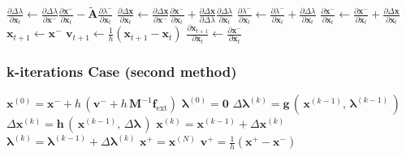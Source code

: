 \documentclass{article}
\newcommand{\pdc}[2]{\frac{\partial #1}{\partial #2}}
\newcommand{\graycomment}[1]{\Comment{\textcolor{gray}{#1}}}
\begin{document}
\begin{algorithm}[H]
\begin{algorithmic}[1]
    \State $\pdc{\Delta \lambda}{\mathbf{x}_t} \gets \pdc{\Delta \lambda}{\mathbf{x}^-}\pdc{\mathbf{x}^-}{\mathbf{x}_t} - \tilde{\mathbf{A}}\pdc{\lambda^-}{\mathbf{x}_t}$
    \graycomment{Eq.~\ref{eq:diffXPBD:explicit:four_needed_derivatives}}
    \State $\pdc{\Delta \mathbf{x}}{\mathbf{x}_t} \gets \pdc{\Delta \mathbf{x}}{\mathbf{x}^-}\pdc{\mathbf{x}^-}{\mathbf{x}_t} + \pdc{\Delta \mathbf{x}}{\Delta \lambda}\pdc{\Delta \lambda}{\mathbf{x}_t}$
    \graycomment{Eq.~\ref{eq:diffXPBD:explicit:four_needed_derivatives}}
    \State $\pdc{\lambda^-}{\mathbf{x}_t}  \gets \pdc{\lambda^-}{\mathbf{x}_t} + \pdc{\Delta \lambda}{\mathbf{x}_t}$
    \graycomment{Eq.~\ref{eq:diffXPBD:explicit:four_needed_derivatives}}
    \State $\pdc{\mathbf{x}^-}{\mathbf{x}_t} \gets \pdc{\mathbf{x}^-}{\mathbf{x}_t} + \pdc{\Delta \mathbf{x}}{\mathbf{x}_t}$
    \graycomment{Eq.~\ref{eq:diffXPBD:explicit:four_needed_derivatives}}
\EndFor
\State $\mathbf{x}_{t+1} \gets \mathbf{x}^-$
\State $\mathbf{v}_{t+1} \gets \frac{1}{h}(\mathbf{x}_{t+1} - \mathbf{x}_{t})$
\State $\pdc{\mathbf{x}_{t+1}}{\mathbf{x}_{t}} \gets \pdc{\mathbf{x}^-}{\mathbf{x}_t}$
\EndFunction
\end{algorithmic}
\end{algorithm}

\subsubsection{k-iterations Case (second method)}

\begin{algorithm}[H]
\caption{Another view of the multi-iteration XPBD time step solve.}
\label{alg:multiiter_xpbd2}
\begin{algorithmic}[1]
\addtolength{\itemsep}{0.5ex}
\State $\mathbf{x}^{(0)} = \mathbf{x}^- + h\,(\mathbf{v}^- + h\,\mathbf{M}^{-1}\mathbf{f}_{\text{ext}})$
\State $\boldsymbol{\lambda}^{(0)} = \mathbf{0}$
    \State $\Delta \boldsymbol{\lambda}^{(k)} = \mathbf{g}\,(\,\mathbf{x}^{(k-1)},\, \boldsymbol{\lambda}^{(k-1)}\,)$ 
    \State $\Delta \mathbf{x}^{(k)} = \mathbf{h}\,(\,\mathbf{x}^{(k-1)},\, \Delta \boldsymbol{\lambda}\,)$ 
    \State $\mathbf{x}^{(k)} = \mathbf{x}^{(k-1)} + \Delta \mathbf{x}^{(k)}$
    \State $\boldsymbol{\lambda}^{(k)} = \boldsymbol{\lambda}^{(k-1)} + \Delta \boldsymbol{\lambda}^{(k)}$
\EndFor
\State $\mathbf{x}^+ = \mathbf{x}^{(N)}$
\State $\mathbf{v}^+ = \frac{1}{h}(\mathbf{x}^+ - \mathbf{x}^-)$
\EndFunction
\end{algorithmic}
\end{algorithm}
\end{document}
